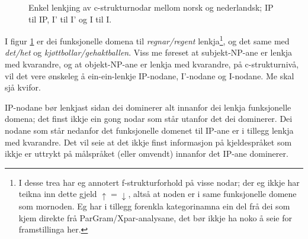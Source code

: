 \documentclass[11pt,a4paper,oneside,draft]{report}
\newcommand{\proj}[2]{\begin{tabular}{c}\footnotesize{#1}\\\normalsize{#2}\end{tabular}}
\newcommand{\ua}{\ensuremath{\uparrow}}
\newcommand{\da}{\ensuremath{\downarrow}}
\begin{document}
\begin{figure}[htp]
\centering
   \caption{Enkel lenkjing av c-strukturnodar mellom norsk og
   nederlandsk; IP til IP, I' til I' og I til I.}
   \label{fig:enkel-c-lenkje}
  \end{figure}

I figur \ref{fig:enkel-c-lenkje} er dei funksjonelle domena til \emph{regnar/regent} 
lenkja\footnote{I desse trea har eg annotert f-strukturforhold på visse nodar;
       der eg ikkje har teikna inn dette gjeld $\ua=\da$, altså at
       noden er i same funksjonelle domene som mornoden. Eg har i
       tillegg forenkla kategorinamna ein del frå dei som kjem direkte
       frå ParGram/Xpar-analysane, det bør ikkje ha noko å seie for
       framstillinga her. }, og det same med \emph{det/het} og \emph{kjøttbollar/gehaktballen}. 
Viss me føreset at subjekt-NP-ane er lenkja med kvarandre, og at
objekt-NP-ane er lenkja med kvarandre, på c-strukturnivå,
vil det vere ønskeleg å ein-ein-lenkje IP-nodane, I'-nodane og
I-nodane. Me skal sjå kvifor.

IP-nodane bør lenkjast sidan dei dominerer alt innanfor dei
lenkja funksjonelle domena; det finst ikkje ein gong nodar som står
utanfor det dei dominerer. Dei nodane som står nedanfor det funksjonelle
domenet til IP-ane er i tillegg lenkja med kvarandre. Det vil seie at
det ikkje finst informasjon på kjeldespråket som ikkje er uttrykt på
målspråket (eller omvendt) innanfor det IP-ane dominerer.
\end{document}
